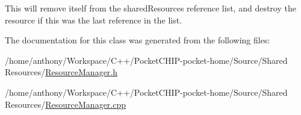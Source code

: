 This will remove itself from the shared\+Resource\textquotesingle{}s reference list, and destroy the resource if this was the last reference in the list. 

The documentation for this class was generated from the following files\+:\begin{DoxyCompactItemize}
\item 
/home/anthony/\+Workspace/\+C++/\+Pocket\+C\+H\+I\+P-\/pocket-\/home/\+Source/\+Shared Resources/\mbox{\hyperlink{ResourceManager_8h}{Resource\+Manager.\+h}}\item 
/home/anthony/\+Workspace/\+C++/\+Pocket\+C\+H\+I\+P-\/pocket-\/home/\+Source/\+Shared Resources/\mbox{\hyperlink{ResourceManager_8cpp}{Resource\+Manager.\+cpp}}\end{DoxyCompactItemize}
